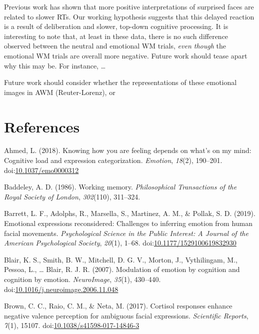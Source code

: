 \documentclass[man]{apa6}
\begin{document}
Previous work has shown that more positive interpretations of surprised faces are related to slower RTs. Our working hypothesis suggests that this delayed reaction is a result of deliberation and slower, top-down cognitive processing. It is interesting to note that, at least in these data, there is no such difference observed between the neutral and emotional WM trials, \emph{even though} the emotional WM trials are overall more negative. Future work should tease apart why this may be. For instance, \ldots{}

Future work should consider whether the representations of these emotional images in AWM (Reuter-Lorenz), or

\newpage

\hypertarget{references}{%
\section{References}\label{references}}

\begingroup
\setlength{\parindent}{-0.5in}
\setlength{\leftskip}{0.5in}

\hypertarget{refs}{}
\leavevmode\hypertarget{ref-ahmed_knowing_2018}{}%
Ahmed, L. (2018). Knowing how you are feeling depends on what's on my mind: Cognitive load and expression categorization. \emph{Emotion}, \emph{18}(2), 190--201. doi:\href{https://doi.org/10.1037/emo0000312}{10.1037/emo0000312}

\leavevmode\hypertarget{ref-baddeley_working_1986}{}%
Baddeley, A. D. (1986). Working memory. \emph{Philosophical Transactions of the Royal Society of London}, \emph{302}(110), 311--324.

\leavevmode\hypertarget{ref-barrett_emotional_2019}{}%
Barrett, L. F., Adolphs, R., Marsella, S., Martinez, A. M., \& Pollak, S. D. (2019). Emotional expressions reconsidered: Challenges to inferring emotion from human facial movements. \emph{Psychological Science in the Public Interest: A Journal of the American Psychological Society}, \emph{20}(1), 1--68. doi:\href{https://doi.org/10.1177/1529100619832930}{10.1177/1529100619832930}

\leavevmode\hypertarget{ref-blair_modulation_2007}{}%
Blair, K. S., Smith, B. W., Mitchell, D. G. V., Morton, J., Vythilingam, M., Pessoa, L., \ldots{} Blair, R. J. R. (2007). Modulation of emotion by cognition and cognition by emotion. \emph{NeuroImage}, \emph{35}(1), 430--440. doi:\href{https://doi.org/10.1016/j.neuroimage.2006.11.048}{10.1016/j.neuroimage.2006.11.048}

\leavevmode\hypertarget{ref-brown_cortisol_2017}{}%
Brown, C. C., Raio, C. M., \& Neta, M. (2017). Cortisol responses enhance negative valence perception for ambiguous facial expressions. \emph{Scientific Reports}, \emph{7}(1), 15107. doi:\href{https://doi.org/10.1038/s41598-017-14846-3}{10.1038/s41598-017-14846-3}
\end{document}
